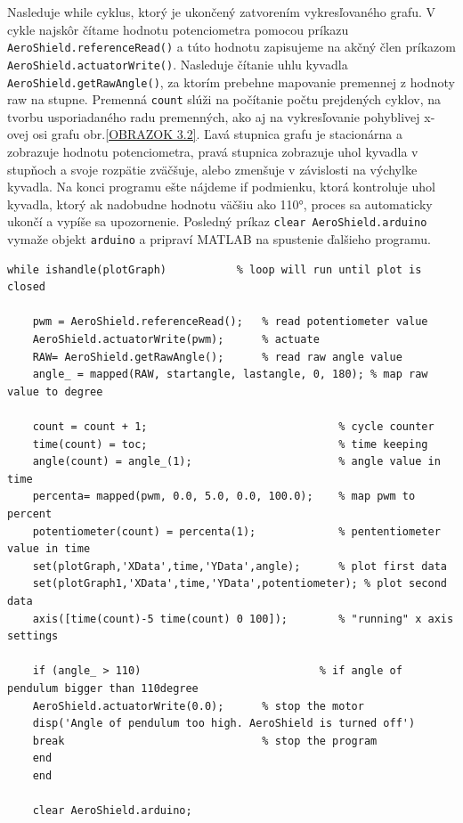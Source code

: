 Nasleduje while cyklus, ktorý je ukončený zatvorením vykresľovaného grafu. V cykle najskôr čítame hodnotu potenciometra pomocou príkazu \verb|AeroShield.referenceRead()| a túto hodnotu zapisujeme na akčný člen príkazom \verb| AeroShield.actuatorWrite()|. Nasleduje čítanie uhlu kyvadla \verb|AeroShield.getRawAngle()|, za ktorím prebehne mapovanie premennej z hodnoty raw na stupne. Premenná \verb|count| slúži na počítanie počtu prejdených cyklov, na tvorbu usporiadaného radu premenných, ako aj na vykresľovanie pohyblivej x-ovej osi grafu obr.\ref{OBRAZOK 3.2}. Ľavá stupnica grafu je stacionárna a zobrazuje hodnotu potenciometra, pravá stupnica zobrazuje uhol kyvadla v stupňoch a svoje rozpätie zväčšuje, alebo zmenšuje v závislosti na výchylke kyvadla. Na konci programu ešte nájdeme if podmienku, ktorá kontroluje uhol kyvadla, ktorý ak nadobudne hodnotu väčšiu ako 110°, proces sa automaticky ukončí a vypíše sa upozornenie. Posledný príkaz \verb|clear AeroShield.arduino| vymaže objekt \verb|arduino| a pripraví MATLAB na spustenie ďalšieho programu. 

\begin{lstlisting}[caption={AeroShield open loop, while cyklus.},captionpos=b]
	while ishandle(plotGraph)           % loop will run until plot is closed
	
	pwm = AeroShield.referenceRead();   % read potentiometer value
	AeroShield.actuatorWrite(pwm);      % actuate 
	RAW= AeroShield.getRawAngle();      % read raw angle value
	angle_ = mapped(RAW, startangle, lastangle, 0, 180); % map raw value to degree 
	
	count = count + 1;                              % cycle counter
	time(count) = toc;                              % time keeping
	angle(count) = angle_(1);                       % angle value in time
	percenta= mapped(pwm, 0.0, 5.0, 0.0, 100.0);    % map pwm to percent 
	potentiometer(count) = percenta(1);             % pententiometer value in time
	set(plotGraph,'XData',time,'YData',angle);      % plot first data 
	set(plotGraph1,'XData',time,'YData',potentiometer); % plot second data 
	axis([time(count)-5 time(count) 0 100]);        % "running" x axis settings
	
	if (angle_ > 110)                            % if angle of pendulum bigger than 110degree
	AeroShield.actuatorWrite(0.0);      % stop the motor 
	disp('Angle of pendulum too high. AeroShield is turned off')
	break                               % stop the program
	end
	end  
	
	clear AeroShield.arduino;           
\end{lstlisting}

